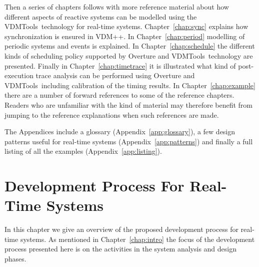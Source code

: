 \documentclass{overturerepchap}
\newcommand{\VDMTools}{VDMTools}
\begin{document}
Then a series of chapters follows with more reference material about
how different aspects of reactive systems can be modelled using the
\VDMTools\ technology for real-time systems. Chapter~\ref{chap:sync}
explains how synchronization is ensured in VDM++.  In
Chapter~\ref{chap:period} modelling of periodic systems and events is
explained. In Chapter~\ref{chap:schedule} the different
kinds of scheduling policy supported by Overture and \VDMTools\ technology are
presented. Finally in Chapter~\ref{chap:timetrace} it is illustrated
what kind of post-execution trace analysis can be performed using
Overture and
\VDMTools\ including calibration of the timing results. In
Chapter~\ref{chap:example} there are a number of forward references to
some of the reference chapters. Readers who are unfamiliar with the
kind of material may therefore benefit from jumping to the reference
explanations when such references are made.

The Appendices include a glossary (Appendix~\ref{app:glossary}), a few
design patterns useful for real-time systems
(Appendix~\ref{app:patterns}) and finally a full listing of all the
examples (Appendix~\ref{app:listing}).

\chapter{Development Process For Real-Time Systems}\label{chap:process}

In this chapter we give an overview of the proposed development
process for real-time systems. As mentioned in
Chapter~\ref{chap:intro} the focus of the development process
presented here is on the activities in the system analysis and design phases.
\end{document}
